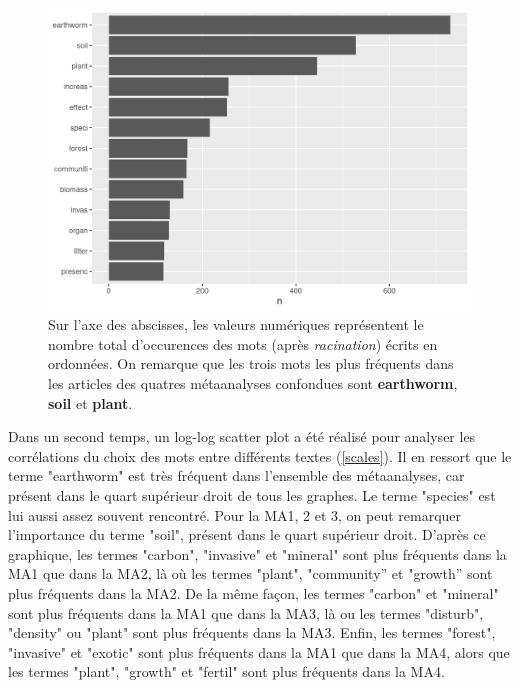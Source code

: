 \documentclass{book}
\begin{document}
\begin{figure}[htb] %
    \begin{center} %
        \includegraphics[width=1\textwidth]{freq_all_MA.png}
        \caption[Fréquence des racines de mots dans le corpus entier]{Sur l'axe des abscisses, les valeurs numériques représentent le nombre total d'occurences des mots (après \textit{racination}) écrits en ordonnées. On remarque que les trois mots les plus fréquents dans les articles des quatres métaanalyses confondues sont \textbf{earthworm}, \textbf{soil} et \textbf{plant}.\label{freq_all}}
    \end{center}  
\end{figure}

\newpage
Dans un second temps, un log-log scatter plot a été réalisé pour analyser les corrélations du choix des mots entre différents textes (\cref{scales}). Il en ressort que le terme "earthworm" est très fréquent dans l'ensemble des métaanalyses, car présent dans le quart supérieur droit de tous les graphes. Le terme "species" est lui aussi assez souvent rencontré. Pour la MA1, 2 et 3, on peut remarquer l'importance du terme "soil", présent dans le quart supérieur droit. D'après ce graphique, les termes "carbon", "invasive" et "mineral" sont plus fréquents dans la MA1 que dans la MA2, là où les termes "plant", "community” et "growth” sont plus fréquents dans la MA2. De la même façon, les termes "carbon" et "mineral" sont plus fréquents dans la MA1 que dans la MA3, là ou les termes "disturb", "density" ou "plant" sont plus fréquents dans la MA3. Enfin, les termes "forest", "invasive" et "exotic" sont plus fréquents dans la MA1 que dans la MA4, alors que les termes "plant", "growth" et "fertil" sont plus fréquents dans la MA4.
\end{document}
